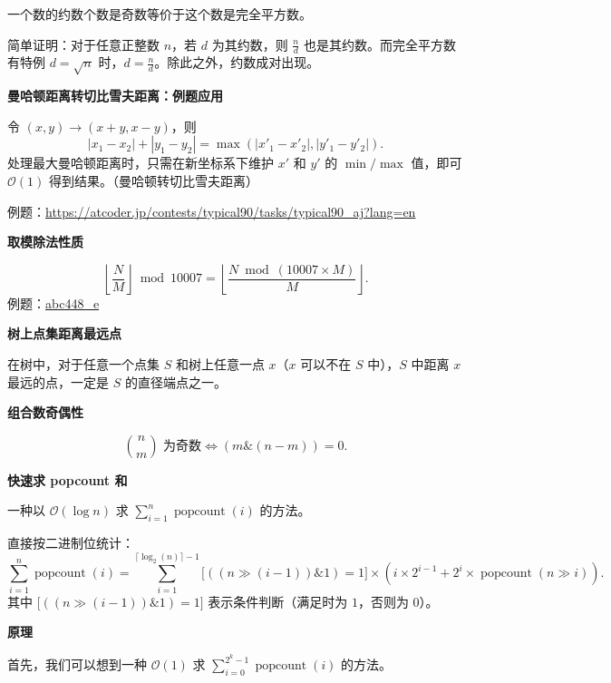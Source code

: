一个数的约数个数是奇数等价于这个数是完全平方数。

简单证明：对于任意正整数 $n$，若 $d$ 为其约数，则 $\frac{n}{d}$ 也是其约数。而完全平方数有特例 $d=\sqrt{n}$ 时，$d=\frac{n}{d}$。除此之外，约数成对出现。

\par\medskip\noindent\textbf{曼哈顿距离转切比雪夫距离：例题应用}\par\smallskip
令 $(x,y)\to (x+y,x-y)$，则
\[
|x_1-x_2|+|y_1-y_2|=\max(|x'_1-x'_2|,|y'_1-y'_2|).
\]
处理最大曼哈顿距离时，只需在新坐标系下维护 $x'$ 和 $y'$ 的 $\min/\max$ 值，即可 $\mathcal{O}(1)$ 得到结果。（曼哈顿转切比雪夫距离）

例题：\url{https://atcoder.jp/contests/typical90/tasks/typical90_aj?lang=en}

\par\medskip\noindent\textbf{取模除法性质}\par\smallskip
\[
\left\lfloor \frac{N}{M} \right\rfloor \bmod 10007 = \left\lfloor \frac{N \bmod (10007 \times M)}{M} \right\rfloor.
\]
例题：\href{https://atcoder.jp/contests/abc448/tasks/abc448_e}{abc448\_e}

\par\medskip\noindent\textbf{树上点集距离最远点}\par\smallskip
在树中，对于任意一个点集 $S$ 和树上任意一点 $x$（$x$ 可以不在 $S$ 中），$S$ 中距离 $x$ 最远的点，一定是 $S$ 的直径端点之一。

\par\medskip\noindent\textbf{组合数奇偶性}\par\smallskip
\[
\binom{n}{m} \text{ 为奇数} \iff (m \& (n-m))=0.
\]

\par\medskip\noindent\textbf{快速求 popcount 和}\par\smallskip
一种以 $\mathcal{O}(\log n)$ 求 $\sum_{i=1}^{n} \operatorname{popcount}(i)$ 的方法。

直接按二进制位统计：
\[
\sum_{i=1}^{n} \operatorname{popcount}(i) = \sum_{i=1}^{\lceil \log_2(n) \rceil - 1} \big[((n \gg (i-1)) \& 1) = 1\big] \times \left( i \times 2^{i-1} + 2^{i} \times \operatorname{popcount}(n \gg i) \right).
\]
其中 $\big[((n \gg (i-1)) \& 1) = 1\big]$ 表示条件判断（满足时为 $1$，否则为 $0$）。

\par\medskip\noindent\textbf{原理}\par\smallskip
首先，我们可以想到一种 $\mathcal{O}(1)$ 求 $\sum_{i=0}^{2^k-1} \operatorname{popcount}(i)$ 的方法。

